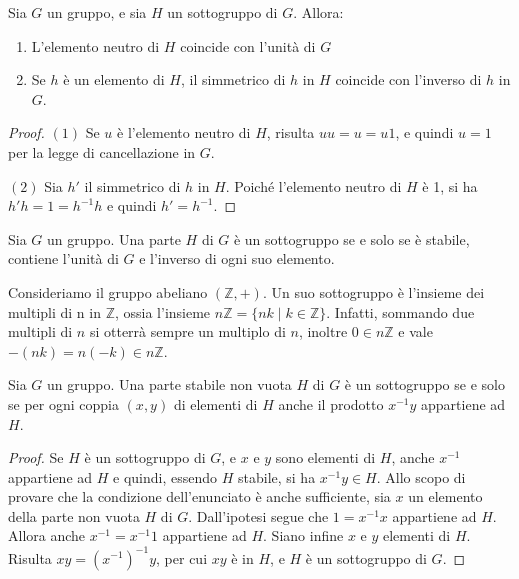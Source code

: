 \begin{lemmabox}
	Sia $G$ un gruppo, e sia $H$ un sottogruppo di $G$. Allora:
	\begin{enumerate}
		\item L'elemento neutro di $H$ coincide con l'unità di $G$
		\item Se $h$ è un elemento di $H$, il simmetrico di $h$ in $H$ coincide con l'inverso di $h$ in $G$.
	\end{enumerate}
\end{lemmabox}

\begin{proof}
	$(1)$ Se $u$ è l'elemento neutro di $H$, risulta $uu=u=u1$, e quindi $u=1$ per la legge di cancellazione in $G$.
	
	$(2)$ Sia $h'$ il simmetrico di $h$ in $H$. Poiché l'elemento neutro di $H$ è 1, si ha $h'h=1=h^{-1}h$ e quindi $h'=h^{-1}$. 
\end{proof}


\begin{corolbox}
	Sia $G$ un gruppo. Una parte $H$ di $G$ è un sottogruppo se e solo se è stabile, contiene l'unità di $G$ e l'inverso di ogni suo elemento.
\end{corolbox}

\begin{example}
	Consideriamo il gruppo abeliano $(\mathbb{Z},+)$. Un suo sottogruppo è l'insieme dei multipli di n in $\mathbb{Z}$, ossia l'insieme $n\mathbb{Z}=\{nk \; | \; k \in \mathbb{Z}\}$. Infatti, sommando due multipli di $n$ si otterrà sempre un multiplo di $n$, inoltre $0 \in n\mathbb{Z}$ e vale $-(nk) = n(-k) \in n \mathbb{Z}$.
\end{example}

\begin{teorbox}
	Sia $G$ un gruppo. Una parte stabile non vuota $H$ di $G$ è un sottogruppo se e solo se per ogni coppia $(x,y)$ di elementi di $H$ anche il prodotto $x^{-1}y$ appartiene ad $H$.
\end{teorbox}


\begin{proof}
	Se $H$ è un sottogruppo di $G$, e $x$ e $y$ sono elementi di $H$, anche $x^{-1}$ appartiene ad $H$ e quindi, essendo $H$ stabile, si ha $x^{-1}y \in H$. Allo scopo di provare che la condizione dell'enunciato è anche sufficiente, sia $x$ un elemento della parte non vuota $H$ di $G$. Dall'ipotesi segue che $1=x^{-1}x$ appartiene ad $H$. Allora anche $x^{-1}=x^{-1}1$ appartiene ad $H$. Siano infine $x$ e $y$ elementi di $H$. Risulta $xy=(x^{-1})^{-1}y$, per cui $xy$ è in $H$, e $H$ è un sottogruppo di $G$. 
\end{proof}

